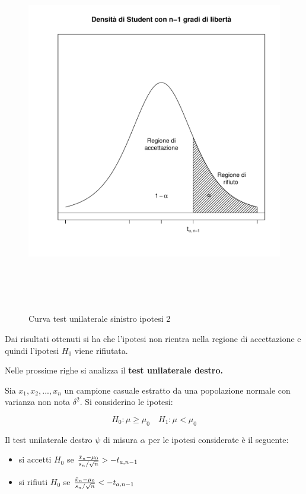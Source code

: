 \begin{figure}[!htb]
    \centering
    \includegraphics[height=16cm]{capitoli/images/3_verifica_ipotesi/curvehp4.pdf}
    \caption{Curva test unilaterale sinistro ipotesi 2}
\end{figure}

Dai risultati ottenuti si ha che l'ipotesi non rientra nella regione di accettazione e quindi l'ipotesi $H_0$ viene rifiutata.

Nelle prossime righe si analizza il \textbf{test unilaterale destro.}

Sia $x_1, x_2, ..., x_n$ un campione casuale estratto da una popolazione normale con varianza non nota $\delta^2$. Si considerino le ipotesi:

\[H_0:\mu \geq \mu_0 \quad H_1:\mu < \mu_0\]

Il test unilaterale destro $\psi$ di misura $\alpha$ per le ipotesi considerate è il seguente:

\begin{itemize}
    \item si accetti $H_0$ se $\frac{\Bar{x}_n - \mu_0}{s_n/\sqrt{n}} > -t_{a,n-1}$
    \item si rifiuti $H_0$ se $\frac{\Bar{x}_n - \mu_0}{s_n/\sqrt{n}} < -t_{a,n-1}$
\end{itemize}


